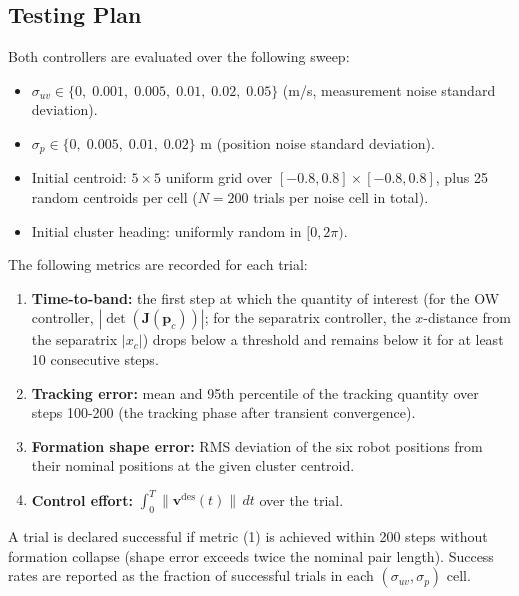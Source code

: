\documentclass[lettersize,journal]{IEEEtran}
\begin{document}
\subsection{Testing Plan}
\label{sec:test_plan}

Both controllers are evaluated over the following sweep:
\begin{itemize}
    \item $\sigma_{uv} \in \{0,\; 0.001,\; 0.005,\; 0.01,\; 0.02,\; 0.05\}$
          (m/s, measurement noise standard deviation).
    \item $\sigma_p \in \{0,\; 0.005,\; 0.01,\; 0.02\}$ m
          (position noise standard deviation).
    \item Initial centroid: $5 \times 5$ uniform grid over
          $[-0.8, 0.8] \times [-0.8, 0.8]$, plus 25 random centroids per
          cell ($N = 200$ trials per noise cell in total).
    \item Initial cluster heading: uniformly random in $[0, 2\pi)$.
\end{itemize}

The following metrics are recorded for each trial:
\begin{enumerate}
    \item \textbf{Time-to-band:} the first step at which the quantity of
          interest (for the OW controller, $|\det(\mathbf{J}(\mathbf{p}_c))|$;
          for the separatrix controller, the $x$-distance from the separatrix
          $|x_c|$) drops below a threshold and remains below it for at least
          10 consecutive steps.
    \item \textbf{Tracking error:} mean and 95th percentile of the tracking
          quantity over steps 100-200 (the tracking phase after transient
          convergence).
    \item \textbf{Formation shape error:} RMS deviation of the six robot
          positions from their nominal positions at the given cluster centroid.
    \item \textbf{Control effort:} $\int_0^T \|\mathbf{v}^{\text{des}}(t)\|
          \,dt$ over the trial.
\end{enumerate}

A trial is declared successful if metric (1) is achieved within 200 steps
without formation collapse (shape error exceeds twice the nominal pair
length). Success rates are reported as the fraction of successful trials
in each $(\sigma_{uv}, \sigma_p)$ cell.


\end{document}
